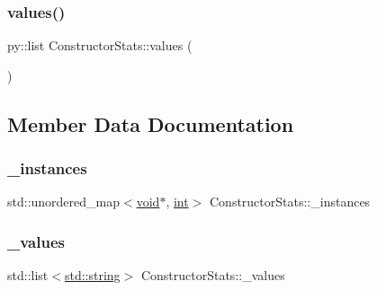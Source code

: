 \mbox{\label{class_constructor_stats_a4d448ff07df374001c45dc31b8f3a105}} 
\subsubsection{\texorpdfstring{values()}{values()}}
{\footnotesize\ttfamily py\+::list Constructor\+Stats\+::values (\begin{DoxyParamCaption}{ }\end{DoxyParamCaption})\hspace{0.3cm}{\ttfamily [inline]}}



\subsection{Member Data Documentation}
\mbox{\label{class_constructor_stats_ac1a574faa15251d5fd56a5f57d23e662}} 
\subsubsection{\texorpdfstring{\_instances}{\_instances}}
{\footnotesize\ttfamily std\+::unordered\+\_\+map$<$\mbox{\hyperlink{_s_d_l__opengles2__gl2ext_8h_ae5d8fa23ad07c48bb609509eae494c95}{void}}$\ast$, \mbox{\hyperlink{warnings_8h_a74f207b5aa4ba51c3a2ad59b219a423b}{int}}$>$ Constructor\+Stats\+::\+\_\+instances\hspace{0.3cm}{\ttfamily [protected]}}

\mbox{\label{class_constructor_stats_a1b6391e5ac7f579d050bb15a222b2325}} 
\subsubsection{\texorpdfstring{\_values}{\_values}}
{\footnotesize\ttfamily std\+::list$<$\mbox{\hyperlink{_s_d_l__opengl__glext_8h_ab4ccfaa8ab0e1afaae94dc96ef52dde1}{std\+::string}}$>$ Constructor\+Stats\+::\+\_\+values\hspace{0.3cm}{\ttfamily [protected]}}

